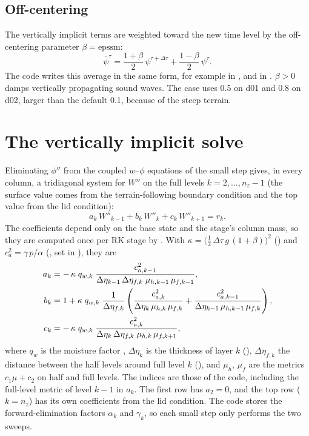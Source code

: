 \subsection{Off-centering}

The vertically implicit terms are weighted toward the new time level by the off-centering parameter
$\beta = \mathrm{epssm}$:
\begin{equation}
  \overline{\psi}^{\tau} = \frac{1+\beta}{2}\,\psi^{\tau+\Delta\tau} + \frac{1-\beta}{2}\,\psi^{\tau}.
\end{equation}
The code writes this average in the same form, for example
 in , and
 in . $\beta > 0$ damps vertically
propagating sound waves. The case uses 0.5 on d01 and 0.8 on d02, larger than the default 0.1, because of the steep
terrain.

\section{The vertically implicit solve}

Eliminating $\phi''$ from the coupled $w$--$\phi$ equations of the small step gives, in every column, a tridiagonal
system for $W''$ on the full levels $k = 2, \dots, n_z - 1$ (the surface value comes from the terrain-following
boundary condition and the top value from the lid condition):
\begin{equation}
  a_k\,W''_{k-1} + b_k\,W''_k + c_k\,W''_{k+1} = r_k .
\end{equation}
The coefficients depend only on the base state and the stage's column mass, so they are computed once per RK stage
by . With
$\kappa = \bigl(\tfrac12\,\Delta\tau\, g\,(1+\beta)\bigr)^2$ () and $c^2_a = \gamma\,p/\alpha$
(, set in ), they are
\begin{align}
  a_k &= -\,\kappa\; q_{w,k}\; \frac{c^2_{a,k-1}}{\Delta\eta_{k-1}\,\Delta\eta_{f,k}\;\mu_{h,k-1}\,\mu_{f,k-1}}, \notag\\
  b_k &= 1 + \kappa\; q_{w,k}\; \frac{1}{\Delta\eta_{f,k}}
         \left(\frac{c^2_{a,k}}{\Delta\eta_k\,\mu_{h,k}\,\mu_{f,k}} + \frac{c^2_{a,k-1}}{\Delta\eta_{k-1}\,\mu_{h,k-1}\,\mu_{f,k}}\right), \\
  c_k &= -\,\kappa\; q_{w,k}\; \frac{c^2_{a,k}}{\Delta\eta_k\,\Delta\eta_{f,k}\;\mu_{h,k}\,\mu_{f,k+1}}, \notag
\end{align}
where $q_{w}$ is the moisture factor , $\Delta\eta_k$ is the thickness of layer $k$ (),
$\Delta\eta_{f,k}$ the distance between the half levels around full level $k$ (), and $\mu_h$, $\mu_f$
are the metrics $c_1\mu + c_2$ on half and full levels. The indices are those of the code, including the full-level
metric of level $k-1$ in $a_k$. The first row has $a_2 = 0$, and the top row ($k = n_z$) has its own coefficients
from the lid condition. The code stores the forward-elimination factors $\alpha_k$ and $\gamma_k$, so each small step only
performs the two sweeps.

